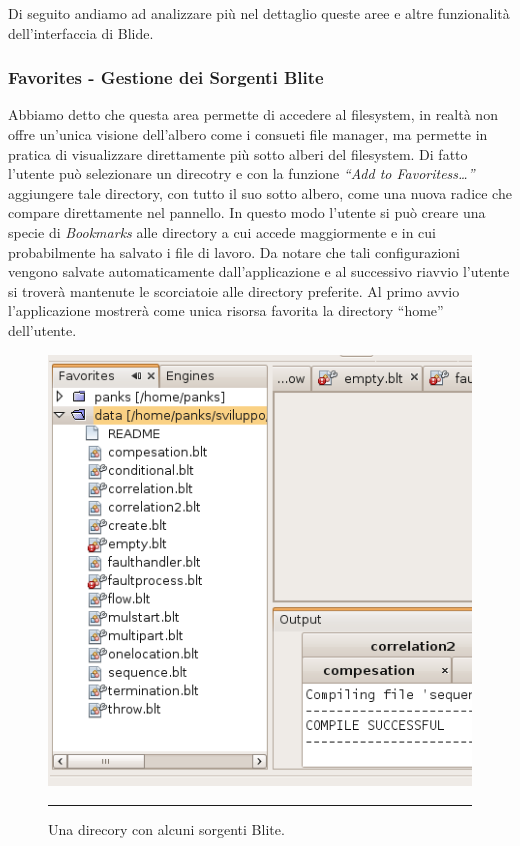 Di seguito andiamo ad analizzare più nel dettaglio queste aree e altre
funzionalità dell'interfaccia di Blide.

\subsubsection*{Favorites - Gestione dei Sorgenti Blite}

Abbiamo detto che questa area permette di accedere al filesystem, in realtà
non offre un'unica visione dell'albero come i consueti file manager, ma
permette in pratica di visualizzare direttamente più sotto alberi del
filesystem. Di fatto l'utente può selezionare un direcotry e con la funzione \emph{``Add to
Favoritess\ldots''} aggiungere tale directory, con tutto il suo sotto albero,
come una nuova radice che compare direttamente nel pannello. In questo modo l'utente
si può creare una specie di \emph{Bookmarks} alle directory a cui accede
maggiormente e in cui probabilmente ha salvato i file di lavoro. Da notare che
tali configurazioni vengono salvate automaticamente dall'applicazione e al
successivo riavvio l'utente si troverà mantenute le scorciatoie alle directory
preferite. Al primo avvio l'applicazione mostrerà come unica risorsa favorita
la directory ``home'' dell'utente.

\begin{figure}[h]
\begin{center}
\includegraphics[scale=0.65]
{blide/dia/BlideFavo}
\caption[Il pannello ``Favorites'']{Una direcory con alcuni sorgenti Blite.}
\rule{7cm}{0.01cm}
  \label{fig:blideFavo}
\end{center}
\end{figure}

